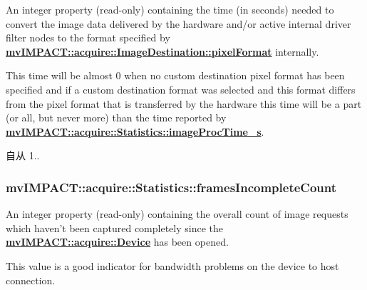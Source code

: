 An integer property {\bfseries }(read-\/only) containing the time (in seconds) needed to convert the image data delivered by the hardware and/or active internal driver filter nodes to the format specified by {\bfseries \hyperlink{classmv_i_m_p_a_c_t_1_1acquire_1_1_image_destination_abfd0d30346d66251d5941a5e57efb784}{mv\+I\+M\+P\+A\+C\+T\+::acquire\+::\+Image\+Destination\+::pixel\+Format}} internally. 

This time will be almost 0 when no custom destination pixel format has been specified and if a custom destination format was selected and this format differs from the pixel format that is transferred by the hardware this time will be a part (or all, but never more) than the time reported by {\bfseries \hyperlink{classmv_i_m_p_a_c_t_1_1acquire_1_1_statistics_ac65c579e00cb51b5c841b6730631fe7e}{mv\+I\+M\+P\+A\+C\+T\+::acquire\+::\+Statistics\+::image\+Proc\+Time\+\_\+s}}.

\begin{DoxySince}{自从}
1.. 
\end{DoxySince}
\hypertarget{classmv_i_m_p_a_c_t_1_1acquire_1_1_statistics_abf27ea8fea8cad9b47b621ecab4e39d9}{
\subsubsection[{frames\+Incomplete\+Count}]{ mv\+I\+M\+P\+A\+C\+T\+::acquire\+::\+Statistics\+::frames\+Incomplete\+Count}}\label{classmv_i_m_p_a_c_t_1_1acquire_1_1_statistics_abf27ea8fea8cad9b47b621ecab4e39d9}


An integer property {\bfseries }(read-\/only) containing the overall count of image requests which haven't been captured completely since the {\bfseries \hyperlink{classmv_i_m_p_a_c_t_1_1acquire_1_1_device}{mv\+I\+M\+P\+A\+C\+T\+::acquire\+::\+Device}} has been opened. 

This value is a good indicator for bandwidth problems on the device to host connection.

